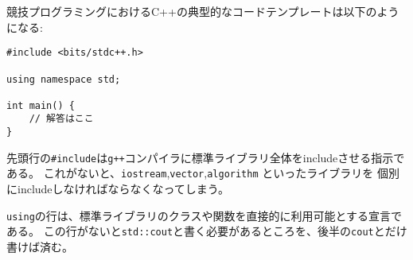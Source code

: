 \begin{comment}
A typical C++ code template for competitive programming
looks like this:
\end{comment}

競技プログラミングにおけるC++の典型的なコードテンプレートは以下のようになる:

\begin{comment}
\begin{lstlisting}
#include <bits/stdc++.h>

using namespace std;

int main() {
    // solution comes here
}
\end{lstlisting}
\end{comment}

\begin{lstlisting}
#include <bits/stdc++.h>

using namespace std;

int main() {
    // 解答はここ
}
\end{lstlisting}

\begin{comment}
The \texttt{\#include} line at the beginning
of the code is a feature of the \texttt{g++} compiler
that allows us to include the entire standard library.
Thus, it is not needed to separately include
libraries such as \texttt{iostream},
\texttt{vector} and \texttt{algorithm},
but rather they are available automatically.
\end{comment}

先頭行の\texttt{\#include}は\texttt{g++}コンパイラに標準ライブラリ全体をincludeさせる指示である。
これがないと、\texttt{iostream},\texttt{vector},\texttt{algorithm} といったライブラリを
個別にincludeしなければならなくなってしまう。

\begin{comment}
The \texttt{using} line declares
that the classes and functions
of the standard library can be used directly
in the code.
Without the \texttt{using} line we would have
to write, for example, \texttt{std::cout},
but now it suffices to write \texttt{cout}.
\end{comment}

\texttt{using}の行は、標準ライブラリのクラスや関数を直接的に利用可能とする宣言である。
この行がないと\texttt{std::cout}と書く必要があるところを、後半の\texttt{cout}とだけ
書けば済む。

\begin{comment}
The code can be compiled using the following command:
\end{comment}


